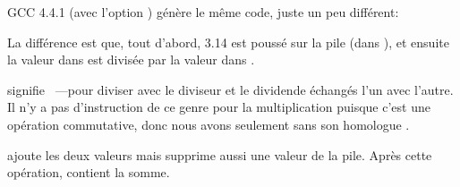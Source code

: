 ﻿

GCC 4.4.1 (avec l'option \Othree) génère le même code, juste un peu différent:



La différence est que, tout d'abord, 3.14 est poussé sur la pile (dans ), et
ensuite la valeur dans  est divisée par la valeur dans .


\FDIVR signifie ~---pour diviser avec le diviseur et le dividende
échangés l'un avec l'autre.
Il n'y a pas d'instruction de ce genre pour la multiplication puisque c'est une opération
commutative, donc nous avons seulement \FMUL sans son homologue .


\FADDP ajoute les deux valeurs mais supprime aussi une valeur de la pile.
Après cette opération,  contient la somme.

